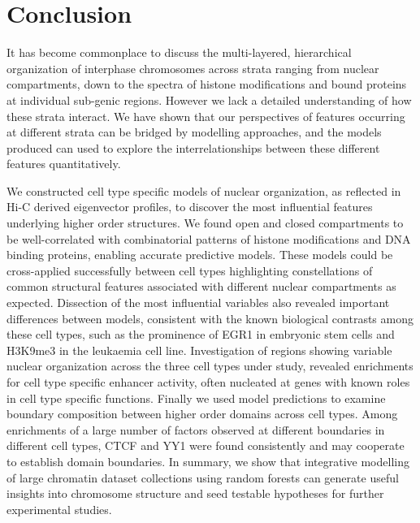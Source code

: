 \documentclass[a4paper,11pt,oneside]{book}
\begin{document}
\section{Conclusion}

It has become commonplace to discuss the multi-layered, hierarchical
organization of interphase chromosomes across strata ranging from
nuclear compartments, down to the spectra of histone modifications and
bound proteins at individual sub-genic regions. However we lack a
detailed understanding of how these strata interact. We have shown
that our perspectives of features occurring at different strata can be
bridged by modelling approaches, and the models produced can used to
explore the interrelationships between these different features
quantitatively. 

We constructed cell type specific models of nuclear
organization, as reflected in Hi-C derived eigenvector profiles, to
discover the most influential features underlying higher order
structures. We found open and closed compartments to be
well-correlated with combinatorial patterns of histone modifications
and DNA binding proteins, enabling accurate predictive models. These
models could be cross-applied successfully between cell types
highlighting constellations of common structural features associated
with different nuclear compartments as expected. Dissection of the
most influential variables also revealed important differences between
models, consistent with the known biological contrasts among these
cell types, such as the prominence of EGR1 in embryonic stem cells and
H3K9me3 in the leukaemia cell line. Investigation of regions showing
variable nuclear organization across the three cell types under study,
revealed enrichments for cell type specific enhancer activity, often
nucleated at genes with known roles in cell type specific
functions. Finally we used model predictions to examine boundary
composition between higher order domains across cell types. Among
enrichments of a large number of factors observed at different
boundaries in different cell types, CTCF and YY1 were found
consistently and may cooperate to establish domain boundaries. In
summary, we show that integrative modelling of large chromatin dataset
collections using random forests can generate useful insights into
chromosome structure and seed testable hypotheses for further
experimental studies.

\ifstandalone
\begin{small}

\end{small}
\fi
\end{document}
